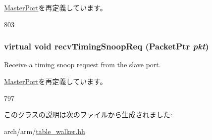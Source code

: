 \hyperlink{classMasterPort_af5b15bc08781cf0ba6190efc37d5b67e}{MasterPort}を再定義しています。


\begin{DoxyCode}
803         { }
\end{DoxyCode}
\hypertarget{classArmISA_1_1TableWalker_1_1SnoopingDmaPort_ae43c73eff109f907118829fcfa9e7096}{
\subsubsection[{recvTimingSnoopReq}]{\setlength{\rightskip}{0pt plus 5cm}virtual void recvTimingSnoopReq ({\bf PacketPtr} {\em pkt})}}
\label{classArmISA_1_1TableWalker_1_1SnoopingDmaPort_ae43c73eff109f907118829fcfa9e7096}
Receive a timing snoop request from the slave port. 

\hyperlink{classMasterPort_ae43c73eff109f907118829fcfa9e7096}{MasterPort}を再定義しています。


\begin{DoxyCode}
797         { }
\end{DoxyCode}


このクラスの説明は次のファイルから生成されました:\begin{DoxyCompactItemize}
\item 
arch/arm/\hyperlink{table__walker_8hh}{table\_\-walker.hh}\end{DoxyCompactItemize}
